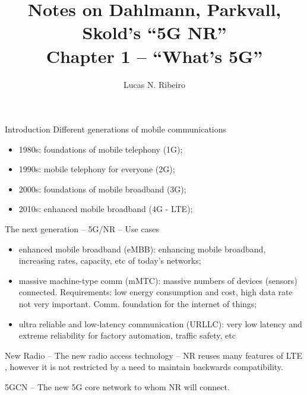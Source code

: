 \documentclass{beamer}
\title[Chapter 7]{Notes on Dahlmann, Parkvall, Skold's ``5G NR''\\Chapter 1 --  ``What's 5G''}
\author{Lucas N. Ribeiro}
\date{}
\begin{document}
	
	\frame{\titlepage}
	
	\begin{frame}[allowframebreaks]{Introduction}
	Different generations of mobile communications
	\begin{itemize}
		\item 1980s: foundations of mobile telephony (1G);
		\item 1990s: mobile telephony for everyone (2G);
		\item 2000s: foundations of mobile broadband (3G);
		\item 2010s: enhanced mobile broadband (4G - LTE);
	\end{itemize}
	
	The next generation  -- 5G/NR -- Use cases
	\begin{itemize}
		\item enhanced mobile broadband (eMBB): enhancing mobile broadband, increasing rates, capacity, etc of today's networks;
		\item massive machine-type comm (mMTC): massive numbers of devices (sensors) connected. Requirements: low energy consumption and cost, high data rate not very important. Comm. foundation for the internet of things;
		\item ultra reliable and low-latency communication (URLLC): very low latency and extreme reliability for factory automation, traffic safety, etc
	\end{itemize}
	
	New Radio -- The new radio access technology -- NR reuses many features of LTE , however it is not restricted by a need to maintain backwards compatibility.
	
	5GCN -- The new 5G core network to whom NR will connect.
	
\end{frame}
\end{document}
